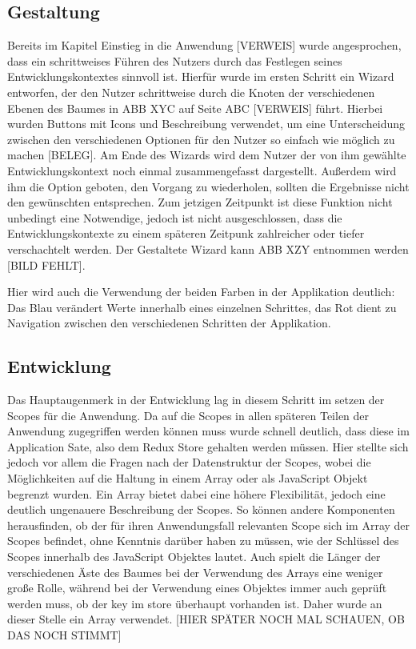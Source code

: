 \subsection{Gestaltung}
Bereits im Kapitel Einstieg in die Anwendung [VERWEIS] wurde angesprochen, dass ein schrittweises Führen des Nutzers durch das Festlegen seines Entwicklungskontextes sinnvoll ist.
Hierfür wurde im ersten Schritt ein Wizard entworfen, der den Nutzer schrittweise durch die Knoten der verschiedenen Ebenen des Baumes in ABB XYC auf Seite ABC [VERWEIS]  führt.
Hierbei wurden Buttons mit Icons und Beschreibung verwendet, um eine Unterscheidung zwischen den verschiedenen Optionen für den Nutzer so einfach wie möglich zu machen [BELEG].
Am Ende des Wizards wird dem Nutzer der von ihm gewählte Entwicklungskontext noch einmal zusammengefasst dargestellt. Außerdem wird ihm die Option geboten, den Vorgang zu wiederholen, sollten die Ergebnisse nicht den gewünschten entsprechen.  Zum jetzigen Zeitpunkt ist  diese Funktion nicht unbedingt eine Notwendige, jedoch ist nicht ausgeschlossen, dass die Entwicklungskontexte zu einem späteren Zeitpunk zahlreicher oder tiefer verschachtelt werden.
Der Gestaltete Wizard kann ABB XZY entnommen werden [BILD FEHLT].

Hier wird auch die Verwendung der beiden Farben in der Applikation deutlich: Das Blau verändert Werte innerhalb eines einzelnen Schrittes, das Rot dient zu Navigation zwischen den verschiedenen Schritten der Applikation.

\subsection{Entwicklung}
Das Hauptaugenmerk in der Entwicklung lag in diesem Schritt im setzen der Scopes für die Anwendung. Da auf die Scopes in allen späteren Teilen der Anwendung zugegriffen werden können muss wurde schnell deutlich, dass diese im Application Sate, also dem Redux Store gehalten werden müssen. Hier stellte sich jedoch vor allem die Fragen nach der Datenstruktur der Scopes, wobei die Möglichkeiten auf die Haltung in einem Array oder als JavaScript Objekt begrenzt wurden.
Ein Array bietet dabei eine höhere Flexibilität, jedoch eine deutlich ungenauere Beschreibung der Scopes. So können andere Komponenten herausfinden, ob der für ihren Anwendungsfall relevanten Scope sich im Array der Scopes befindet, ohne Kenntnis darüber haben zu müssen, wie der Schlüssel des Scopes innerhalb des JavaScript Objektes lautet. Auch spielt die Länger der verschiedenen Äste des Baumes bei der Verwendung des Arrays eine weniger große Rolle, während bei der Verwendung eines Objektes immer auch geprüft werden muss, ob der key im store überhaupt vorhanden ist. Daher wurde an dieser Stelle ein Array verwendet.
[HIER SPÄTER NOCH MAL SCHAUEN, OB DAS NOCH STIMMT]

